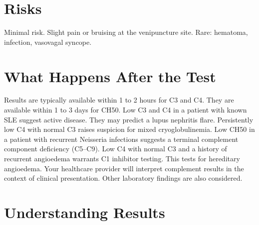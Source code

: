 \section*{Risks}
Minimal risk. Slight pain or bruising at the venipuncture site. Rare: hematoma, infection, vasovagal syncope.

\section*{What Happens After the Test}
Results are typically available within 1 to 2 hours for C3 and C4. They are available within 1 to 3 days for CH50. Low C3 and C4 in a patient with known SLE suggest active disease. They may predict a lupus nephritis flare. Persistently low C4 with normal C3 raises suspicion for mixed cryoglobulinemia. Low CH50 in a patient with recurrent Neisseria infections suggests a terminal complement component deficiency (C5--C9). Low C4 with normal C3 and a history of recurrent angioedema warrants C1 inhibitor testing. This tests for hereditary angioedema. Your healthcare provider will interpret complement results in the context of clinical presentation. Other laboratory findings are also considered.

\section*{Understanding Results}

